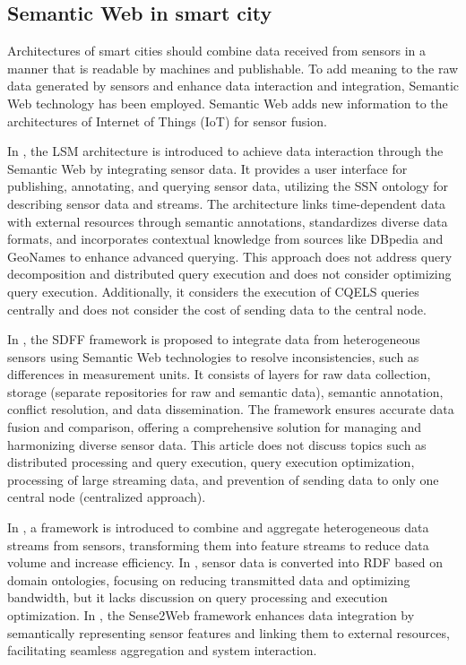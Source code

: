 \documentclass[5p,times]{elsarticle}
\begin{document}
\subsection{Semantic Web in smart city}

Architectures of smart cities should combine data received from sensors in a manner that is readable by machines and publishable. To add meaning to the raw data generated by sensors and enhance data interaction and integration, Semantic Web technology has been employed. Semantic Web adds new information to the architectures of Internet of Things (IoT) for sensor fusion.



In \cite{article28}, the LSM architecture is introduced to achieve data interaction through the Semantic Web by integrating sensor data. It provides a user interface for publishing, annotating, and querying sensor data, utilizing the SSN ontology for describing sensor data and streams. The architecture links time-dependent data with external resources through semantic annotations, standardizes diverse data formats, and incorporates contextual knowledge from sources like DBpedia and GeoNames to enhance advanced querying.
This approach does not address query decomposition and distributed query execution and does not consider
  optimizing query execution. Additionally, it considers the execution of CQELS queries centrally and does not consider 
  the cost of sending data to the central node.


In \cite{Al-Baltah2020}, the SDFF framework is proposed to integrate data from heterogeneous sensors using Semantic Web technologies to resolve inconsistencies, such as differences in measurement units. It consists of layers for raw data collection, storage (separate repositories for raw and semantic data), semantic annotation, conflict resolution, and data dissemination. The framework ensures accurate data fusion and comparison, offering a comprehensive solution for managing and harmonizing diverse sensor data.
This article does not discuss topics such as distributed processing and query execution, query execution optimization, processing of large streaming data, and prevention of sending data to only one central node (centralized approach).


In \cite{Samadian2014}, a framework is introduced to combine and aggregate heterogeneous data streams from sensors, 
transforming them into feature streams to reduce data volume and increase efficiency.
 In \cite{inproceedings31}, sensor data is converted into RDF based on domain ontologies, 
 focusing on reducing transmitted data and optimizing bandwidth, but it lacks discussion on query 
 processing and execution optimization.
  In \cite{article32}, the Sense2Web framework enhances data integration by semantically representing sensor features and linking them to external resources, facilitating seamless aggregation and system interaction.
\end{document}
